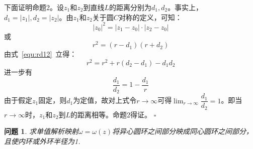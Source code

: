 \documentclass{article}
\newtheorem{QUESTION}{问题}
\newenvironment{SOLUTION}[1][{}]{{\noindent\heiti 解#1：}}{\hfill $\square$\par}
\begin{document}
\begin{SOLUTION}[法2]
    下面证明命题2。设$z_1$和$z_2$到直线$L$的距离分别为$d_1,d_2$。事实上，$d_1=|z_1|,d_2=|z_2|$。由$z_1$和$z_2$关于圆$C$对称的定义，可知：
    \begin{equation}
    |z_0|^2=|z_1-z_0|\cdot|z_2-z_0|
    \end{equation}
    或
    \begin{equation}
    r^2=(r-d_1)(r+d_2)
    \label{equ:rd12}
    \end{equation}
    由式~\eqref{equ:rd12}~立得：
    \begin{equation*}
    r^2=r^2+r(d_2-d_1)-d_1d_2
    \end{equation*}
    进一步有
    \begin{equation}
    \dfrac{d_1}{d_2}=1-\dfrac{d_1}{r}
    \end{equation}
    由于假定$z_1$固定，则$d_1$为定值，故对上式令$r\rightarrow\infty$可得$\lim_{r\rightarrow\infty}\limits\dfrac{d_1}{d_2}=1$。即当$r\rightarrow\infty$时，$z_1$和$z_2$到$L$的距离相等。命题2得证。
    \end{SOLUTION}
    \begin{QUESTION}
    求单值解析映射$\omega=\omega(z)$将异心圆环之间部分映成同心圆环之间部分，且使内环或外环半径为1.
    \end{QUESTION}
\end{document}
